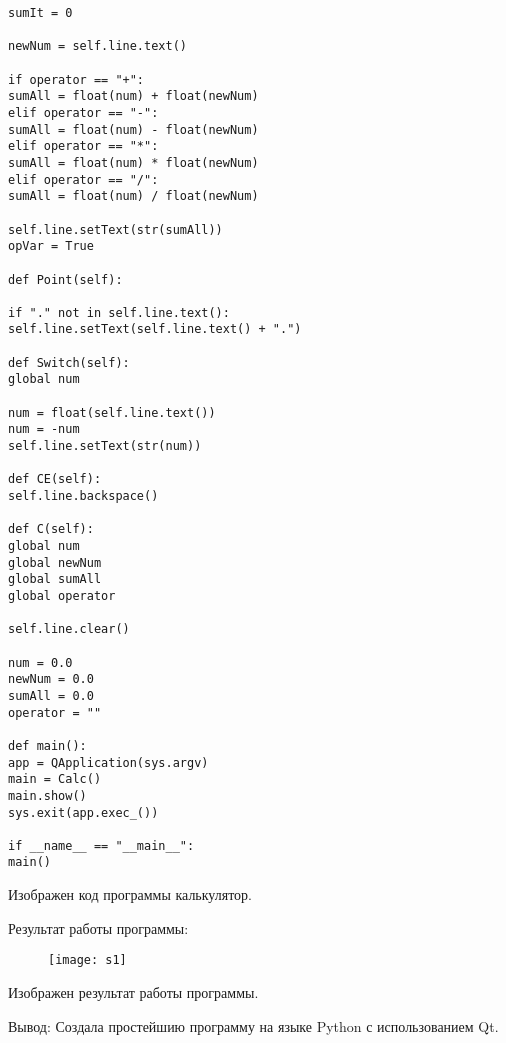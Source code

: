 \begin{verbatim}
sumIt = 0

newNum = self.line.text()

if operator == "+":
sumAll = float(num) + float(newNum)
elif operator == "-":
sumAll = float(num) - float(newNum)
elif operator == "*":
sumAll = float(num) * float(newNum)
elif operator == "/":
sumAll = float(num) / float(newNum)

self.line.setText(str(sumAll))
opVar = True

def Point(self):

if "." not in self.line.text():
self.line.setText(self.line.text() + ".")

def Switch(self):
global num

num = float(self.line.text())
num = -num
self.line.setText(str(num))

def CE(self):
self.line.backspace()

def C(self):
global num
global newNum
global sumAll
global operator

self.line.clear()

num = 0.0
newNum = 0.0
sumAll = 0.0
operator = ""

def main():
app = QApplication(sys.argv)
main = Calc()
main.show()
sys.exit(app.exec_())

if __name__ == "__main__":
main()
\end{verbatim}
Изображен код программы калькулятор.
\begin{center}
Результат работы программы:
\end{center}

\begin{figure}[h]
	\centering
	\texttt{[image: s1]}

	\label{fig:s1}
\end{figure}
Изображен результат работы программы.

Вывод: Создала простейшию программу на языке Python с использованием Qt.




